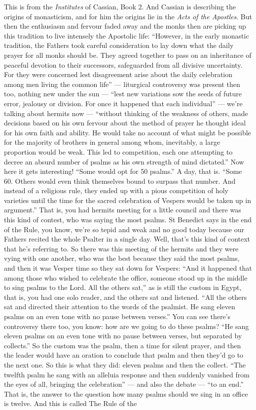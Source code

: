 This is from the \emph{Institutes} of Cassian, Book 2. And Cassian is describing the origins of monasticism, and for him the origins lie in the \emph{Acts of the Apostles}. But then the enthusiasm and fervour faded away and the monks then are picking up this tradition to live intensely the Apostolic life: ``However, in the early monastic tradition, the Fathers took careful consideration to lay down what the daily prayer for all monks should be. They agreed together to pass on an inheritance of peaceful devotion to their successors, safeguarded from all divisive uncertainty. For they were concerned lest disagreement arise about the daily celebration among men living the common life'' --- liturgical controversy was present then too, nothing new under the sun --- ``lest new variations sow the seeds of future error, jealousy or division. For once it happened that each individual'' --- we're talking about hermits now --- ``without thinking of the weakness of others, made decisions based on his own fervour about the method of prayer he thought ideal for his own faith and ability. He would take no account of what might be possible for the majority of brothers in general among whom, inevitably, a large proportion would be weak. This led to competition, each one attempting to decree an absurd number of psalms as his own strength of mind dictated.'' Now here it gets interesting! ``Some would opt for 50 psalms.'' A day, that is. ``Some 60. Others would even think themselves bound to surpass that number. And instead of a religious rule, they ended up with a pious competition of holy varieties until the time for the sacred celebration of Vespers would be taken up in argument.'' That is, you had hermits meeting for a little council and there was this kind of contest, who was saying the most psalms. St Benedict says in the end of the Rule, you know, we're so tepid and weak and no good today because our Fathers recited the whole Psalter in a single day. Well, that's this kind of context that he's referring to. So there was this meeting of the hermits and they were vying with one another, who was the best because they said the most psalms, and then it was Vesper time so they sat down for Vespers: ``And it happened that among those who wished to celebrate the office, someone stood up in the middle to sing psalms to the Lord. All the others sat,'' as is still the custom in Egypt, that is, you had one solo reader, and the others sat and listened. ``All the others sat and directed their attention to the words of the psalmist. He sang eleven psalms on an even tone with no pause between verses.'' You can see there's controversy there too, you know: how are we going to do these psalms? ``He sang eleven psalms on an even tone with no pause between verses, but separated by collects.'' So the custom was the psalm, then a time for silent prayer, and then the leader would have an oration to conclude that psalm and then they'd go to the next one. So this is what they did: eleven psalms and then the collect. ``The twelfth psalm he sang with an alleluia response and then suddenly vanished from the eyes of all, bringing the celebration'' --- and also the debate --- ``to an end.'' That is, the answer to the question how many psalms should we sing in an office is twelve. And this is called The Rule of the 